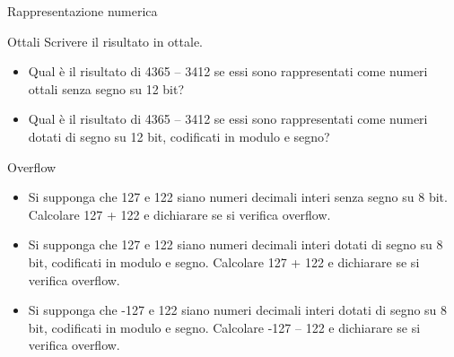 \documentclass[11pt]{article}
\begin{document}
\begin{quiz}{Rappresentazione numerica}
\begin{cloze}[points=1,shuffle=false]{Ottali}
Scrivere il risultato in ottale.
\begin{itemize}
\item Qual è il risultato di 4365 – 3412 se essi sono rappresentati come numeri ottali senza segno su 12 bit? 
    \item Qual è il risultato di 4365 – 3412 se essi sono rappresentati come numeri dotati di segno su 12 bit, codificati in modulo e segno? 
\end{itemize}
\end{cloze}

\begin{cloze}[points=1,shuffle=false]{Overflow}
\begin{itemize}
\item Si supponga che 127 e 122 siano numeri decimali interi senza segno su 8 bit. Calcolare 127 + 122 e dichiarare se si verifica overflow. 
\item Si supponga che 127 e 122 siano numeri decimali interi dotati di segno su 8 bit, codificati in modulo e segno. Calcolare 127 + 122 e dichiarare se si verifica overflow. 
\item Si supponga che -127 e 122 siano numeri decimali interi dotati di segno su 8 bit, codificati in modulo e segno. Calcolare -127 – 122 e dichiarare se si verifica overflow.
\end{itemize}
\end{cloze}


\end{quiz}
\end{document}
